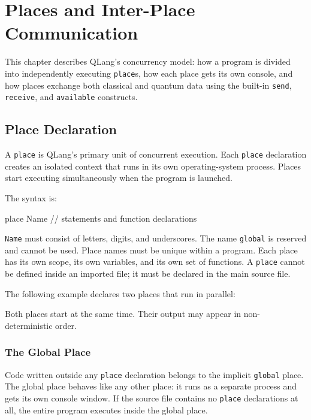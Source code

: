 \section{Places and Inter-Place Communication}
\label{sec:places-and-communication}

This chapter describes QLang's concurrency model: how a program is divided into
independently executing \texttt{place}s, how each place gets its own console,
and how places exchange both classical and quantum data using the built-in
\texttt{send}, \texttt{receive}, and \texttt{available} constructs.

\subsection{Place Declaration}
\label{sec:place-declaration}

A \texttt{place} is QLang's primary unit of concurrent execution. Each
\texttt{place} declaration creates an isolated context that runs in its own
operating-system process. Places start executing simultaneously when the
program is launched.

The syntax is:

\begin{codebox}
place Name {
    // statements and function declarations
}
\end{codebox}

\texttt{Name} must consist of letters, digits, and underscores. The name
\texttt{global} is reserved and cannot be used. Place names must be unique
within a program. Each place has its own scope, its own variables, and its
own set of functions. A \texttt{place} cannot be defined inside an imported file;
it must be declared in the main source file.

The following example declares two places that run in parallel:



Both places start at the same time. Their output may appear in non-deterministic order.

\subsubsection{The Global Place}

Code written outside any \texttt{place} declaration belongs to the implicit
\texttt{global} place. The global place behaves like any other place: it runs as
a separate process and gets its own console window. If the source file contains
no \texttt{place} declarations at all, the entire program executes inside the
global place.

